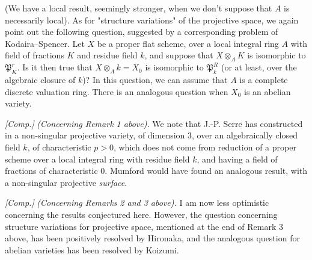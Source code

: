 \begin{remark}
\begin{enumerate}
              (We have a local result, seemingly stronger, when we don't suppose that $A$ is necessarily local).
              As for "structure variations" of the projective space, we again point out the following question, suggested by a corresponding problem of Kodaira–Spencer.
              Let $X$ be a proper flat scheme, over a local integral ring $A$ with field of fractions $K$ and residue field $k$, and suppose that $X\otimes_AK$ is isomorphic to $\mathfrak{P}_K^r$.
              Is it then true that $X\otimes_Ak=X_0$ is isomorphic to $\mathfrak{P}_k^R$ (or at least, over the algebraic closure of $k$)?
              In this question, we can assume that $A$ is a complete discrete valuation ring.
              There is an analogous question when $X_0$ is an abelian variety.
    \end{enumerate}
\end{remark}


\begin{remark}\label{fga2-6-remark-i}
    \emph{[Comp.]}
    \emph{(Concerning Remark 1 above).}
    We note that J.-P. Serre has constructed in \cite{Ser1961} a non-singular projective variety, of dimension $3$, over an algebraically closed field $k$, of characteristic $p>0$, which does not come from reduction of a proper scheme over a local integral ring with residue field $k$, and having a field of fractions of characteristic $0$.
    Mumford would have found an analogous result, with a non-singular projective \emph{surface}.
\end{remark}

\begin{remark}\label{fga2-6-remark-ii}
    \emph{[Comp.]}
    \emph{(Concerning Remarks 2 and 3 above).}
    I am now less optimistic concerning the results conjectured here.
    However, the question concerning structure variations for projective space, mentioned at the end of Remark 3 above, has been positively resolved by Hironaka, and the analogous question for abelian varieties has been resolved by Koizumi.
\end{remark}